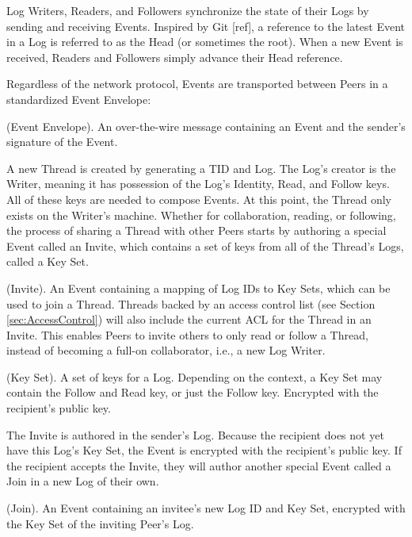 \documentclass{comjnl}
\begin{document}
Log Writers, Readers, and Followers synchronize the state of their Logs by sending and receiving Events. Inspired by Git [ref], a reference to the latest Event in a Log is referred to as the Head (or sometimes the root). When a new Event is received, Readers and Followers simply advance their Head reference.

Regardless of the network protocol, Events are transported between Peers in a standardized Event Envelope:

\begin{definition}
(Event Envelope). An over-the-wire message containing an Event and the sender’s signature of the Event.
\end{definition}

A new Thread is created by generating a TID and Log. The Log’s creator is the Writer, meaning it has possession of the Log’s Identity, Read, and Follow keys. All of these keys are needed to compose Events. At this point, the Thread only exists on the Writer’s machine. Whether for collaboration, reading, or following, the process of sharing a Thread with other Peers starts by authoring a special Event called an Invite, which contains a set of keys from all of the Thread’s Logs, called a Key Set.

\begin{definition}
(Invite). An Event containing a mapping of Log IDs to Key Sets, which can be used to join a Thread. Threads backed by an access control list (see Section  \ref{sec:AccessControl}) will also include the current ACL for the Thread in an Invite. This enables Peers to invite others to only read or follow a Thread, instead of becoming a full-on collaborator, i.e., a new Log Writer.
\end{definition}

\begin{definition}
(Key Set). A set of keys for a Log. Depending on the context, a Key Set may contain the Follow and Read key, or just the Follow key. Encrypted with the recipient’s public key.
\end{definition}

The Invite is authored in the sender’s Log. Because the recipient does not yet have this Log’s Key Set, the Event is encrypted with the recipient’s public key. If the recipient accepts the Invite, they will author another special Event called a Join in a new Log of their own.

\begin{definition}
(Join). An Event containing an invitee’s new Log ID and Key Set, encrypted with the Key Set of the inviting Peer’s Log.
\end{definition}
\end{document}
